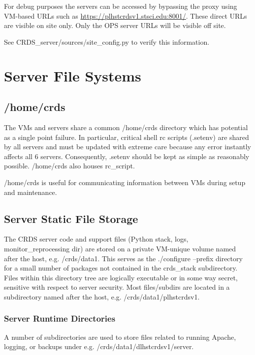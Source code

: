 \documentclass[letterpaper,10pt,english]{sphinxmanual}
\begin{document}
For debug purposes the servers can be accessed by bypassing the proxy using VM-based URLs such
as \href{https://plhstcrdsv1.stsci.edu:8001/}{https://plhstcrdsv1.stsci.edu:8001/}.  These direct URLs are visible on site only.  Only the OPS
server URLs will be visible off site.

See CRDS\_server/sources/site\_config.py to verify this information.


\chapter{Server File Systems}
\label{server_guide:server-file-systems}

\section{/home/crds}
\label{server_guide:home-crds}
The VMs and servers share a common /home/crds directory which has potential as a single point failure.  In particular,
critical shell rc scripts (.setenv) are shared by all servers and must be updated with extreme care because
any error instantly affects all 6 servers.  Consequently, .setenv should be kept as simple as reasonably
possible.  /home/crds also houses rc\_script.

/home/crds is useful for communicating information between VMs during setup and maintenance.


\section{Server Static File Storage}
\label{server_guide:server-static-file-storage}
The CRDS server code and support files (Python stack, logs, monitor\_reprocessing dir) are stored on
a private VM-unique volume named after the host,  e.g.  /crds/data1.  This serves as the
./configure --prefix directory for a small number of packages not contained in the crds\_stack subdirectory.
Files within this directory tree are logically executable or in some way secret,  sensitive with respect
to server security.   Most files/subdirs are located in a subdirectory named after the host,
e.g. /crds/data1/plhstcrdsv1.


\subsection{Server Runtime Directories}
\label{server_guide:server-runtime-directories}
A number of subdirectories are used to store files related to running Apache, logging, or backups under
e.g. /crds/data1/dlhstcrdsv1/server.
\end{document}
